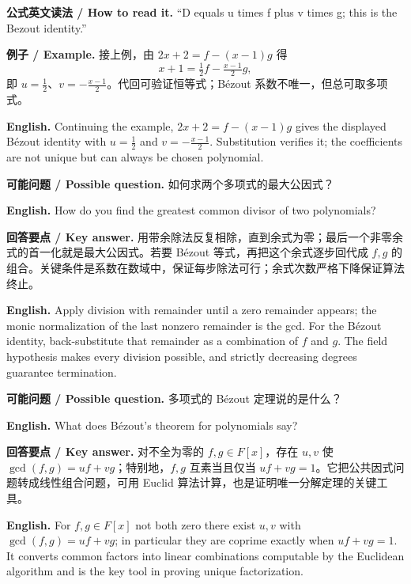\documentclass[UTF8,11pt,a4paper]{ctexart}
\newcommand{\EN}[1]{\par\noindent\textbf{English.} #1\par}
\newcommand{\READ}[1]{\par\noindent\textbf{公式英文读法 / How to read it.} #1\par}
\newcommand{\EX}[2]{\par\noindent\textbf{例子 / Example.} #1\par\EN{#2}}
\newcommand{\ASK}[4]{\par\noindent\textbf{可能问题 / Possible question.} #1\par\EN{#2}\noindent\textbf{回答要点 / Key answer.} #3\par\EN{#4}\medskip}
\begin{document}
\READ{``D equals u times f plus v times g; this is the Bezout identity.''}
\EX{接上例，由 $2x+2=f-(x-1)g$ 得
\[
x+1=\tfrac12 f-\tfrac{x-1}{2}g,
\]
即 $u=\tfrac12$、$v=-\tfrac{x-1}{2}$。代回可验证恒等式；Bézout 系数不唯一，但总可取多项式。}{Continuing the example, $2x+2=f-(x-1)g$ gives the displayed Bézout identity with $u=\tfrac12$ and $v=-\tfrac{x-1}{2}$. Substitution verifies it; the coefficients are not unique but can always be chosen polynomial.}
\ASK{如何求两个多项式的最大公因式？}{How do you find the greatest common divisor of two polynomials?}{用带余除法反复相除，直到余式为零；最后一个非零余式的首一化就是最大公因式。若要 Bézout 等式，再把这个余式逐步回代成 $f,g$ 的组合。关键条件是系数在数域中，保证每步除法可行；余式次数严格下降保证算法终止。}{Apply division with remainder until a zero remainder appears; the monic normalization of the last nonzero remainder is the gcd. For the Bézout identity, back-substitute that remainder as a combination of $f$ and $g$. The field hypothesis makes every division possible, and strictly decreasing degrees guarantee termination.}
\ASK{多项式的 Bézout 定理说的是什么？}{What does Bézout's theorem for polynomials say?}{对不全为零的 $f,g\in F[x]$，存在 $u,v$ 使 $\gcd(f,g)=uf+vg$；特别地，$f,g$ 互素当且仅当 $uf+vg=1$。它把公共因式问题转成线性组合问题，可用 Euclid 算法计算，也是证明唯一分解定理的关键工具。}{For $f,g\in F[x]$ not both zero there exist $u,v$ with $\gcd(f,g)=uf+vg$; in particular they are coprime exactly when $uf+vg=1$. It converts common factors into linear combinations computable by the Euclidean algorithm and is the key tool in proving unique factorization.}
\end{document}
